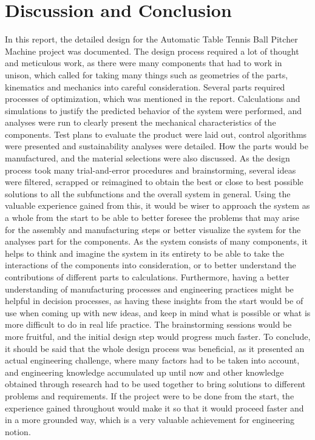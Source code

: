 \documentclass[12pt]{article}
\begin{document}
\section{Discussion and Conclusion}
In this report, the detailed design for the Automatic Table Tennis Ball Pitcher Machine project was documented. The design process required a lot of thought and meticulous work, as there were many components that had to work in unison, which called for taking many things such as geometries of the parts, kinematics and mechanics into careful consideration. Several parts required processes of optimization, which was mentioned in the report. Calculations and simulations to justify the predicted behavior of the system were performed, and analyses were run to clearly present the mechanical characteristics of the components. Test plans to evaluate the product were laid out, control algorithms were presented and sustainability analyses were detailed. How the parts would be manufactured, and the material selections were also discussed.
As the design process took many trial-and-error procedures and brainstorming, several ideas were filtered, scrapped or reimagined to obtain the best or close to best possible solutions to all the subfunctions and the overall system in general. Using the valuable experience gained from this, it would be wiser to approach the system as a whole from the start to be able to better foresee the problems that may arise for the assembly and manufacturing steps or better visualize the system for the analyses part for the components. As the system consists of many components, it helps to think and imagine the system in its entirety to be able to take the interactions of the components into consideration, or to better understand the contributions of different parts to calculations. Furthermore, having a better understanding of manufacturing processes and engineering practices might be helpful in decision processes, as having these insights from the start would be of use when coming up with new ideas, and keep in mind what is possible or what is more difficult to do in real life practice. The brainstorming sessions would be more fruitful, and the initial design step would progress much faster.
To conclude, it should be said that the whole design process was beneficial, as it presented an actual engineering challenge, where many factors had to be taken into account, and engineering knowledge accumulated up until now and other knowledge obtained through research had to be used together to bring solutions to different problems and requirements. If the project were to be done from the start, the experience gained throughout would make it so that it would proceed faster and in a more grounded way, which is a very valuable achievement for engineering notion.
\end{document}
